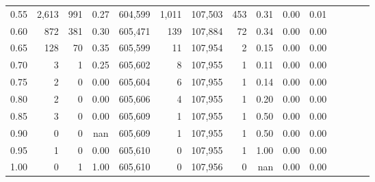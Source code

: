 \begin{tabular}{rrrcrrrrrrrrrrr}
0.55 &    2,613 &     991 &                                       0.27 &  604,599 &    1,011 &  107,503 &      453 &  0.31 &  0.00 &                         0.01 \\
0.60 &      872 &     381 &                                       0.30 &  605,471 &      139 &  107,884 &       72 &  0.34 &  0.00 &                         0.00 \\
0.65 &      128 &      70 &                                       0.35 &  605,599 &       11 &  107,954 &        2 &  0.15 &  0.00 &                         0.00 \\
0.70 &        3 &       1 &                                       0.25 &  605,602 &        8 &  107,955 &        1 &  0.11 &  0.00 &                         0.00 \\
0.75 &        2 &       0 &                                       0.00 &  605,604 &        6 &  107,955 &        1 &  0.14 &  0.00 &                         0.00 \\
0.80 &        2 &       0 &                                       0.00 &  605,606 &        4 &  107,955 &        1 &  0.20 &  0.00 &                         0.00 \\
0.85 &        3 &       0 &                                       0.00 &  605,609 &        1 &  107,955 &        1 &  0.50 &  0.00 &                         0.00 \\
0.90 &        0 &       0 &                                        nan &  605,609 &        1 &  107,955 &        1 &  0.50 &  0.00 &                         0.00 \\
0.95 &        1 &       0 &                                       0.00 &  605,610 &        0 &  107,955 &        1 &  1.00 &  0.00 &                         0.00 \\
1.00 &        0 &       1 &                                       1.00 &  605,610 &        0 &  107,956 &        0 &   nan &  0.00 &                         0.00 \\
\bottomrule
\end{tabular}
